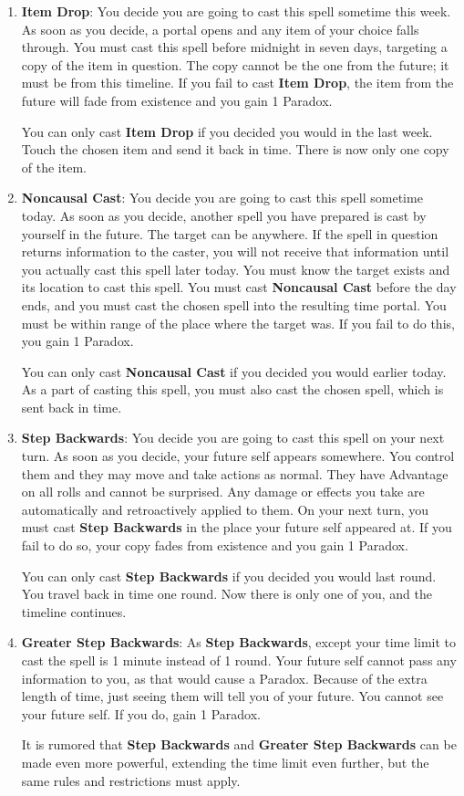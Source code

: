 \documentclass[twoside]{article}
\begin{document}
\begin{enumerate}[nosep]
\item \textbf{Item Drop}: You decide you are going to cast this spell sometime this week. As soon as you decide, a portal opens and any item of your choice falls through. You must cast this spell before midnight in seven days, targeting a copy of the item in question. The copy cannot be the one from the future; it must be from this timeline. If you fail to cast \textbf{Item Drop}, the item from the future will fade from existence and you gain 1 Paradox.

You can only cast \textbf{Item Drop} if you decided you would in the last week. Touch the chosen item and send it back in time. There is now only one copy of the item.
\item \textbf{Noncausal Cast}: You decide you are going to cast this spell sometime today. As soon as you decide, another spell you have prepared is cast by yourself in the future. The target can be anywhere. If the spell in question returns information to the caster, you will not receive that information until you actually cast this spell later today. You must know the target exists and its location to cast this spell. You must cast \textbf{Noncausal Cast} before the day ends, and you must cast the chosen spell into the resulting time portal. You must be within range of the place where the target was. If you fail to do this, you gain 1 Paradox.

You can only cast \textbf{Noncausal Cast} if you decided you would earlier today. As a part of casting this spell, you must also cast the chosen spell, which is sent back in time.
\item \textbf{Step Backwards}: You decide you are going to cast this spell on your next turn. As soon as you decide, your future self appears somewhere. You control them and they may move and take actions as normal. They have Advantage on all rolls and cannot be surprised. Any damage or effects you take are automatically and retroactively applied to them. On your next turn, you must cast \textbf{Step Backwards} in the place your future self appeared at. If you fail to do so, your copy fades from existence and you gain 1 Paradox.

You can only cast \textbf{Step Backwards} if you decided you would last round. You travel back in time one round. Now there is only one of you, and the timeline continues.
\item \textbf{Greater Step Backwards}: As \textbf{Step Backwards}, except your time limit to cast the spell is 1 minute instead of 1 round. Your future self cannot pass any information to you, as that would cause a Paradox. Because of the extra length of time, just seeing them will tell you of your future. You cannot see your future self. If you do, gain 1 Paradox.

It is rumored that \textbf{Step Backwards} and \textbf{Greater Step Backwards} can be made even more powerful, extending the time limit even further, but the same rules and restrictions must apply.
\end{enumerate}
\end{document}
